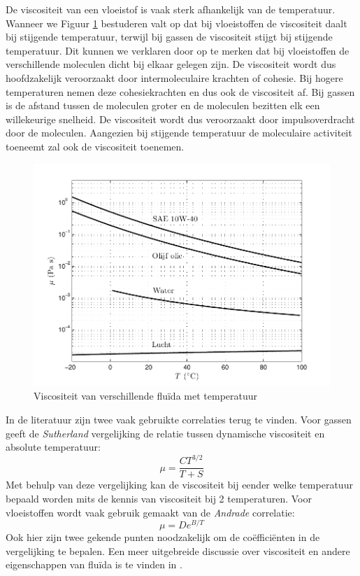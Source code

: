 De viscositeit van een vloeistof is vaak sterk afhankelijk van de temperatuur. Wanneer we Figuur \ref{fig:dynamische viscositeit temperatuur} bestuderen valt op dat bij vloeistoffen de viscositeit daalt bij stijgende temperatuur, terwijl bij gassen de viscositeit stijgt bij stijgende temperatuur. Dit kunnen we verklaren door op te merken dat bij vloeistoffen de verschillende moleculen dicht bij elkaar gelegen zijn. De viscositeit wordt dus hoofdzakelijk veroorzaakt door intermoleculaire krachten of cohesie. Bij hogere temperaturen nemen deze cohesiekrachten en dus ook de viscositeit af. Bij gassen is de afstand tussen de moleculen groter en de moleculen bezitten elk een willekeurige snelheid. De viscositeit wordt dus veroorzaakt door impulsoverdracht door de moleculen. Aangezien bij stijgende temperatuur de moleculaire activiteit toeneemt zal ook de viscositeit toenemen.
\begin{figure}[htb]
	\centering
	\includegraphics{fig/basisbegrippen/Dynamische_viscositeit_temperatuur.pdf}
	\caption{Viscositeit van verschillende fluïda met temperatuur}
	\label{fig:dynamische viscositeit temperatuur}
\end{figure}

In de literatuur zijn twee vaak gebruikte correlaties terug te vinden. Voor gassen geeft de \emph{Sutherland} vergelijking de relatie tussen dynamische viscositeit en absolute temperatuur:
\begin{equation}
	\mu = \frac{C T^{3/2}}{T+S}
\end{equation}
Met behulp van deze vergelijking kan de viscositeit bij eender welke temperatuur bepaald worden mits de kennis van viscositeit bij 2 temperaturen. Voor vloeistoffen wordt vaak gebruik gemaakt van de \emph{Andrade} correlatie:
\begin{equation}
	\mu = D e^{B/T}
\end{equation}
Ook hier zijn twee gekende punten noodzakelijk om de coëfficiënten in de vergelijking te bepalen. Een meer uitgebreide discussie over viscositeit en andere eigenschappen van fluïda is te vinden in \cite{Poling2001}.

